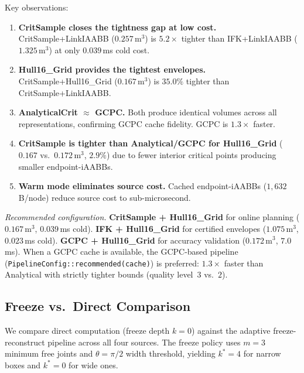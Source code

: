 \documentclass[journal]{IEEEtran}
\begin{document}
Key observations:
\begin{enumerate}
\item \textbf{CritSample closes the tightness gap at low cost.}
  CritSample+LinkIAABB ($0.257$\,m$^3$) is $5.2{\times}$ tighter
  than IFK+LinkIAABB ($1.325$\,m$^3$) at only $0.039$\,ms cold cost.

\item \textbf{Hull16\_Grid provides the tightest envelopes.}
  CritSample+Hull16\_Grid ($0.167$\,m$^3$) is $35.0\%$ tighter
  than CritSample+LinkIAABB.

\item \textbf{AnalyticalCrit $\approx$ GCPC.}
  Both produce identical volumes across all representations,
  confirming GCPC cache fidelity.
  GCPC is $1.3{\times}$ faster.

\item \textbf{CritSample is tighter than Analytical/GCPC for Hull16\_Grid}
  ($0.167$ vs.\ $0.172$\,m$^3$, $2.9\%$) due to fewer interior
  critical points producing smaller endpoint-iAABBs.

\item \textbf{Warm mode eliminates source cost.}
  Cached endpoint-iAABBs ($1{,}632$\,B/node) reduce source cost
  to sub-microsecond.
\end{enumerate}

\emph{Recommended configuration.}
\textbf{CritSample + Hull16\_Grid} for online planning
($0.167$\,m$^3$, $0.039$\,ms cold).
\textbf{IFK + Hull16\_Grid} for certified envelopes
($1.075$\,m$^3$, $0.023$\,ms cold).
\textbf{GCPC + Hull16\_Grid} for accuracy validation
($0.172$\,m$^3$, $7.0$\,ms).
When a GCPC cache is available, the GCPC-based pipeline
(\texttt{PipelineConfig::recommended(cache)})
is preferred: $1.3{\times}$ faster than Analytical with
strictly tighter bounds (quality level~$3$ vs.~$2$).

\subsection{Freeze vs.\ Direct Comparison}\label{sec:exp_freeze}


We compare direct computation (freeze depth $k{=}0$)
against the adaptive freeze-reconstruct pipeline
across all four sources.
The freeze policy uses $m{=}3$ minimum free joints
and $\theta{=}\pi/2$ width threshold, yielding
$k^*{=}4$ for narrow boxes and $k^*{=}0$ for wide ones.
\end{document}
